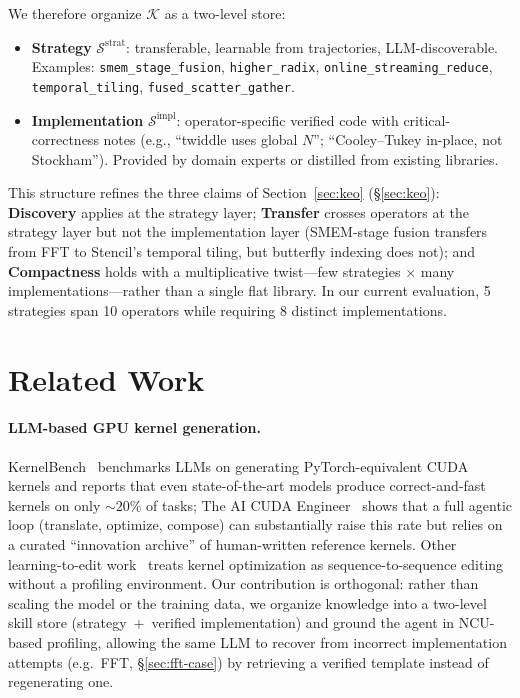 \documentclass[sigconf,nonacm]{acmart}
\begin{document}
We therefore organize $\mathcal{K}$ as a two-level store:

\begin{itemize}
    \item \textbf{Strategy} $\mathcal{S}^{\text{strat}}$:
    transferable, learnable from trajectories,
    LLM-discoverable. Examples: \texttt{smem\_stage\_fusion},
    \texttt{higher\_radix}, \texttt{online\_streaming\_reduce},
    \texttt{temporal\_tiling}, \texttt{fused\_scatter\_gather}.
    \item \textbf{Implementation} $\mathcal{S}^{\text{impl}}$:
    operator-specific verified code with critical-correctness
    notes (e.g., ``twiddle uses global $N$''; ``Cooley--Tukey
    in-place, not Stockham''). Provided by domain experts or
    distilled from existing libraries.
\end{itemize}

This structure refines the three claims of
Section~\ref{sec:keo} (\S\ref{sec:keo}): \textbf{Discovery}
applies at the strategy layer; \textbf{Transfer} crosses operators
at the strategy layer but not the implementation layer
(SMEM-stage fusion transfers from FFT to Stencil's temporal
tiling, but butterfly indexing does not); and \textbf{Compactness}
holds with a multiplicative twist---few strategies $\times$ many
implementations---rather than a single flat library. In our
current evaluation, 5 strategies span 10 operators while requiring
8 distinct implementations.

\section{Related Work}

\paragraph{LLM-based GPU kernel generation.}
KernelBench~\cite{ouyang2025kernelbench} benchmarks LLMs on
generating PyTorch-equivalent CUDA kernels and reports that even
state-of-the-art models produce correct-and-fast kernels on only
$\sim\!20\%$ of tasks; The AI CUDA Engineer~\cite{lange2025aicuda}
shows that a full agentic loop (translate, optimize, compose) can
substantially raise this rate but relies on a curated ``innovation
archive'' of human-written reference kernels. Other learning-to-edit
work~\cite{shypula2024kernelagent} treats kernel optimization as
sequence-to-sequence editing without a profiling environment. Our
contribution is orthogonal: rather than scaling the model or the
training data, we organize knowledge into a two-level skill store
(strategy~+~verified implementation) and ground the agent in NCU-based
profiling, allowing the same LLM to recover from incorrect
implementation attempts (e.g.\ FFT, \S\ref{sec:fft-case}) by
retrieving a verified template instead of regenerating one.
\end{document}
